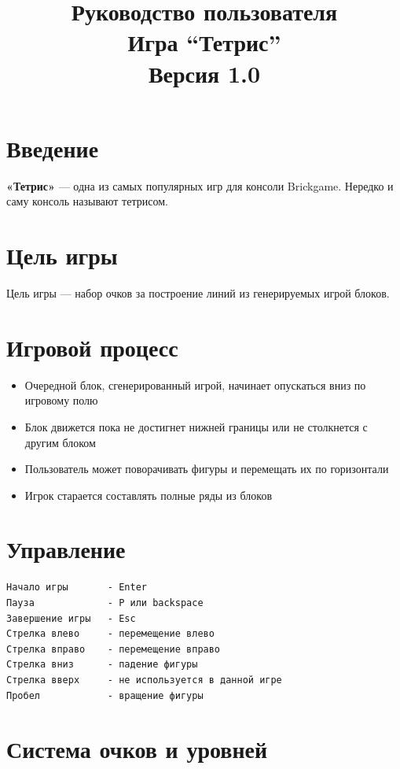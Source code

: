 \documentclass[12pt,a4paper]{article}
\title{Руководство пользователя \\ Игра ``Тетрис'' \\ Версия 1.0}
\begin{document}
\maketitle

\section{Введение}

\textbf{«Тетрис»} — одна из самых популярных игр для консоли Brickgame. Нередко и саму консоль называют тетрисом.

\section{Цель игры}

Цель игры — набор очков за построение линий из генерируемых игрой блоков.

\section{Игровой процесс}

\begin{itemize}
\item Очередной блок, сгенерированный игрой, начинает опускаться вниз по игровому полю
\item Блок движется пока не достигнет нижней границы или не столкнется с другим блоком
\item Пользователь может поворачивать фигуры и перемещать их по горизонтали
\item Игрок старается составлять полные ряды из блоков
\end{itemize}

\section{Управление}

\begin{verbatim}
Начало игры       - Enter
Пауза             - P или backspace
Завершение игры   - Esc
Стрелка влево     - перемещение влево
Стрелка вправо    - перемещение вправо
Стрелка вниз      - падение фигуры
Стрелка вверх     - не используется в данной игре
Пробел            - вращение фигуры
\end{verbatim}

\section{Система очков и уровней}
\end{document}
